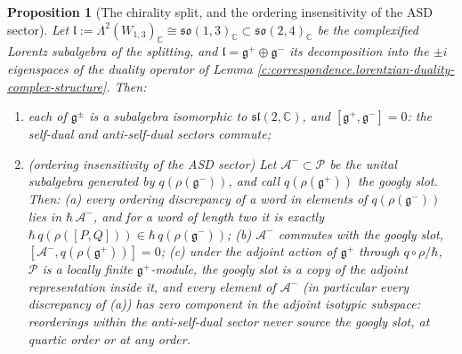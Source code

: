 \documentclass[11pt]{article}
\newtheorem{proposition}[theorem]{Proposition}
\theoremstyle{definition}
\theoremstyle{plain}
\newcommand{\changedmark}[2]{\marginpar{\raggedright\scriptsize\color{#1}#2}}
\providecommand{\C}{}\renewcommand{\C}{\mathbb{C}}
\begin{document}
\begin{proposition}[The chirality split, and the ordering insensitivity of the ASD sector]\label{c:correspondence.chirality-split-ordering-insensitivity-asd-sector}
\changedmark{gray}{reworded}
Let $\mathfrak{l} := \Lambda^2 (W_{1,3})_\C \cong \mathfrak{so}(1,3)_\C \subset \mathfrak{so}(2,4)_\C$ be the complexified Lorentz subalgebra of the splitting, and $\mathfrak{l} = \mathfrak{g}^+ \oplus \mathfrak{g}^-$ its decomposition into the $\pm i$ eigenspaces of the duality operator of Lemma \ref{c:correspondence.lorentzian-duality-complex-structure}. Then:
\begin{enumerate}
\item each of $\mathfrak{g}^\pm$ is a subalgebra isomorphic to $\mathfrak{sl}(2,\C)$, and $[\mathfrak{g}^+, \mathfrak{g}^-] = 0$: the self-dual and anti-self-dual sectors commute;
\item (\emph{ordering insensitivity of the ASD sector}) Let $\mathcal{A}^- \subset \mathcal{P}$ be the unital subalgebra generated by $q(\rho(\mathfrak{g}^-))$, and call $q(\rho(\mathfrak{g}^+))$ the \emph{googly slot}. Then: (a) every ordering discrepancy of a word in elements of $q(\rho(\mathfrak{g}^-))$ lies in $\hbar\,\mathcal{A}^-$, and for a word of length two it is exactly $\hbar\,q(\rho([P, Q])) \in \hbar\,q(\rho(\mathfrak{g}^-))$; (b) $\mathcal{A}^-$ commutes with the googly slot, $[\mathcal{A}^-, q(\rho(\mathfrak{g}^+))] = 0$; (c) under the adjoint action of $\mathfrak{g}^+$ through $q\circ\rho/\hbar$, $\mathcal{P}$ is a locally finite $\mathfrak{g}^+$-module, the googly slot is a copy of the adjoint representation inside it, and every element of $\mathcal{A}^-$ (in particular every discrepancy of (a)) has zero component in the adjoint isotypic subspace: reorderings within the anti-self-dual sector never source the googly slot, at quartic order or at any order.
\end{enumerate}
\end{proposition}
\end{document}
